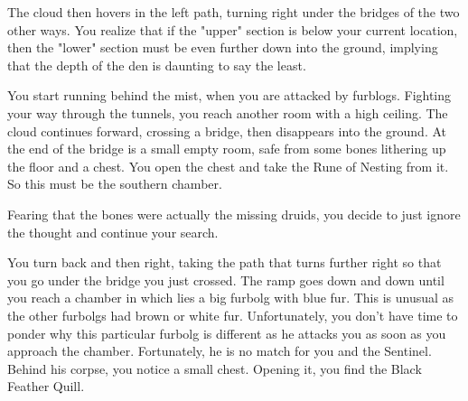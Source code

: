 
The cloud then hovers in the left path, turning right under the bridges of the two other ways. You realize that if the "upper" section is below your current location, then the "lower" section must be even further down into the ground, implying that the depth of the den is daunting to say the least.

You start running behind the mist, when you are attacked by furblogs. Fighting your way through the tunnels, you reach another room with a high ceiling. The cloud continues forward, crossing a bridge, then disappears into the ground. At the end of the bridge is a small empty room, safe from some bones lithering up the floor and a chest. You open the chest and take the Rune of Nesting from it. So this must be the southern chamber.


Fearing that the bones were actually the missing druids, you decide to just ignore the thought and continue your search.



You turn back and then right, taking the path that turns further right so that you go under the bridge you just crossed. The ramp goes down and down until you reach a chamber in which lies a big furbolg with blue fur. This is unusual as the other furbolgs had brown or white fur. Unfortunately, you don't have time to ponder why this particular furbolg is different as he attacks you as soon as you approach the chamber. Fortunately, he is no match for you and the Sentinel. Behind his corpse, you notice a small chest. Opening it, you find the Black Feather Quill.




